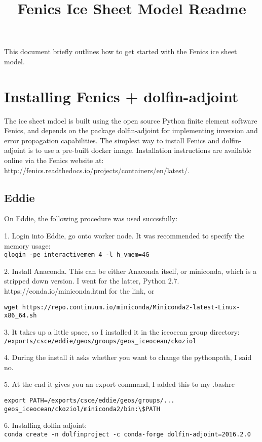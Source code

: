 \documentclass[11pt, reqno, nocenter]{article}
\title{Fenics Ice Sheet Model Readme}
\begin{document}
\maketitle

This document briefly outlines how to get started with the Fenics ice sheet model. 


\section{Installing Fenics + dolfin-adjoint}

The ice sheet mdoel is built using the open source Python finite element software Fenics, and depends on the package dolfin-adjoint for implementing inversion and error propagation capabilities. The simplest way to install Fenics and dolfin-adjoint is to use a pre-built docker image. Installation instructions are available online via the Fenics website at: http://fenics.readthedocs.io/projects/containers/en/latest/.

\subsection{Eddie}
On Eddie, the following procedure was used succssfully:

1. Login into Eddie, go onto worker node. It was recommended to specify the memory usage:\\
 \verb!qlogin -pe interactivemem 4 -l h_vmem=4G!
 
2. Install Anaconda. This can be either Anaconda itself, or miniconda, which is a stripped down version. I went for the latter, Python 2.7.
https://conda.io/miniconda.html for the link, or

 \verb!wget https://repo.continuum.io/miniconda/Miniconda2-latest-Linux-x86_64.sh!

3. It takes up a little space, so I installed it in the iceocean group directory: \\
 \verb!/exports/csce/eddie/geos/groups/geos_iceocean/ckoziol!

4. During the install it asks whether you want to change the pythonpath, I said no. 

5. At the end it gives you an export command, I added this to my .bashrc
\begin{verbatim}
export PATH=/exports/csce/eddie/geos/groups/...
geos_iceocean/ckoziol/miniconda2/bin:\$PATH
\end{verbatim}

6. Installing dolfin adjoint: \\
 \verb!conda create -n dolfinproject -c conda-forge dolfin-adjoint=2016.2.0!
\end{document}
